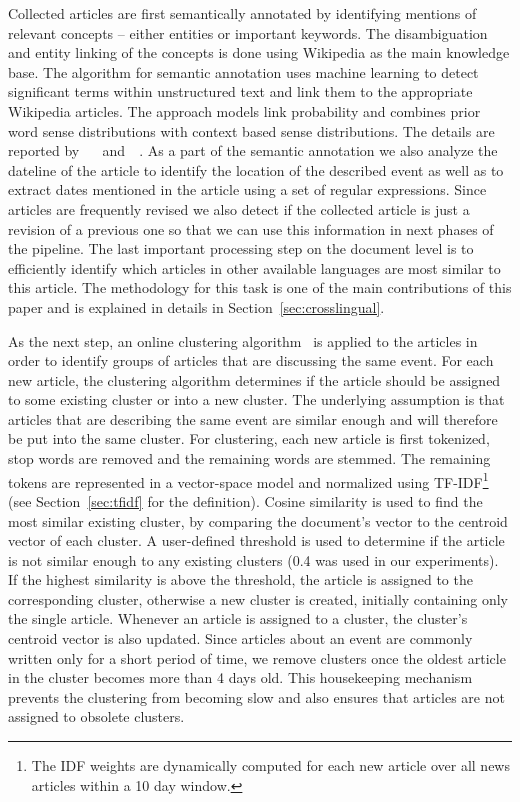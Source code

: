 \documentclass[twoside,11pt]{article}
\begin{document}
Collected articles are first semantically annotated by identifying mentions of relevant concepts -- either entities or important keywords. The disambiguation and entity linking of the concepts is done using Wikipedia as the main knowledge base. The algorithm for semantic annotation uses machine learning to detect significant terms within unstructured text and link them to the appropriate Wikipedia articles. The approach models link probability and combines prior word sense distributions with context based sense distributions. The details are reported by
~\citeauthor{Milne:2008:LLW:1458082.1458150}~\citeyear{Milne:2008:LLW:1458082.1458150} and~\citeauthor{zhang2014saaacamactat}~\citeyear{zhang2014saaacamactat}. As a part of the semantic annotation we also analyze the dateline of the article to identify the location of the described event as well as to extract dates mentioned in the article using a set of regular expressions. Since articles are frequently revised we also detect if the collected article is just a revision of a previous one so that we can use this information in next phases of the pipeline. The last important processing step on the document level is to efficiently identify which articles in other available languages are most similar to this article. The methodology for this task is one of the main contributions of this paper and is explained in details in Section~\ref{sec:crosslingual}.

As the next step, an online clustering algorithm~\cite{brank2014} is applied to the articles in order to identify groups of articles that are discussing the same event. For each new article, the clustering algorithm determines if the article should be assigned to some existing cluster or into a new cluster. The underlying assumption is that articles that are describing the same event are similar enough and will therefore be put into the same cluster. For clustering, each new article is first tokenized, stop words are removed and the remaining words are stemmed.
The remaining tokens are represented in a vector-space model and normalized using TF-IDF\footnote{The IDF weights are dynamically computed for each new article over all news articles within a 10 day window.} (see Section~\ref{sec:tfidf} for the definition). Cosine similarity is used to find the most similar existing cluster, by comparing the document's vector to the centroid vector of each cluster. A user-defined threshold is used to determine if the article is not similar enough to any existing clusters (0.4 was used in our experiments).  If the highest similarity is above the threshold, the article is assigned to the corresponding cluster, otherwise a new cluster is created, initially containing only the single article. Whenever an article is assigned to a cluster, the cluster's centroid vector is also updated. Since articles about an event are commonly written only for a short period of time, we remove clusters once the oldest article in the cluster becomes more than 4 days old. This housekeeping mechanism prevents the clustering from becoming slow and also ensures that articles are not assigned to obsolete clusters.
\end{document}
